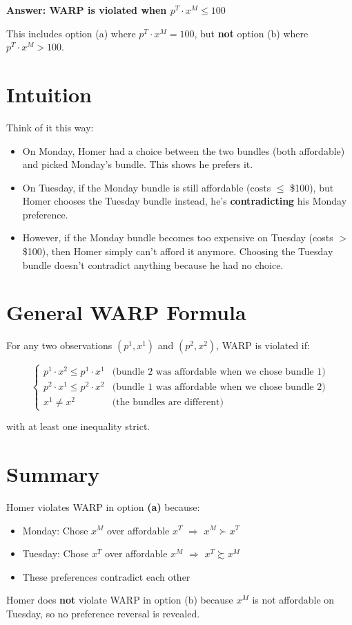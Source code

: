 \documentclass[11pt]{article}
\begin{document}
\textbf{Answer: WARP is violated when $p^T \cdot x^M \leq 100$}

This includes option (a) where $p^T \cdot x^M = 100$, but \textbf{not} option (b) where $p^T \cdot x^M > 100$.

\section{Intuition}

Think of it this way:
\begin{itemize}
    \item On Monday, Homer had a choice between the two bundles (both affordable) and picked Monday's bundle. This shows he prefers it.

    \item On Tuesday, if the Monday bundle is still affordable (costs $\leq$ \$100), but Homer chooses the Tuesday bundle instead, he's \textbf{contradicting} his Monday preference.

    \item However, if the Monday bundle becomes too expensive on Tuesday (costs $>$ \$100), then Homer simply can't afford it anymore. Choosing the Tuesday bundle doesn't contradict anything because he had no choice.
\end{itemize}

\section{General WARP Formula}

For any two observations $(p^1, x^1)$ and $(p^2, x^2)$, WARP is violated if:

\[
\boxed{
\begin{cases}
p^1 \cdot x^2 \leq p^1 \cdot x^1 & \text{(bundle 2 was affordable when we chose bundle 1)} \\
p^2 \cdot x^1 \leq p^2 \cdot x^2 & \text{(bundle 1 was affordable when we chose bundle 2)} \\
x^1 \neq x^2 & \text{(the bundles are different)}
\end{cases}
}
\]

with at least one inequality strict.

\section{Summary}

Homer violates WARP in option \textbf{(a)} because:
\begin{itemize}
    \item Monday: Chose $x^M$ over affordable $x^T$ $\Rightarrow$ $x^M \succ x^T$
    \item Tuesday: Chose $x^T$ over affordable $x^M$ $\Rightarrow$ $x^T \succsim x^M$
    \item These preferences contradict each other
\end{itemize}

Homer does \textbf{not} violate WARP in option (b) because $x^M$ is not affordable on Tuesday, so no preference reversal is revealed.
\end{document}
